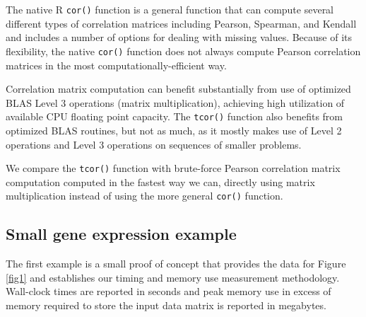 \documentclass{article}
\let\proglang=\textsf
\numberwithin{algorithmctr}{section}
\begin{document}
The native \proglang{R} {\tt cor()} function is a general function that can
compute several different types of correlation matrices including Pearson,
Spearman, and Kendall and includes a number of options for dealing with missing
values.  Because of its flexibility, the native {\tt cor()} function does not
always compute Pearson correlation matrices in the most
computationally-efficient way.

Correlation matrix computation can benefit substantially from use of optimized
BLAS Level 3 operations (matrix multiplication), achieving high utilization of
available CPU floating point capacity. The {\tt tcor()} function also benefits
from optimized BLAS routines, but not as much, as it mostly makes use of Level
2 operations and Level 3 operations on sequences of smaller problems.

We compare the {\tt tcor()} function with brute-force Pearson correlation
matrix computation computed in the fastest way we can, directly using matrix
multiplication instead of using the more general {\tt cor()} function.

\subsection{Small gene expression example}

The first example is a small proof of concept that provides the data for Figure
\ref{fig1} and establishes our timing and memory use measurement methodology.
Wall-clock times are reported in seconds and peak memory use in excess of
memory required to store the input data matrix is reported in megabytes.
\end{document}
